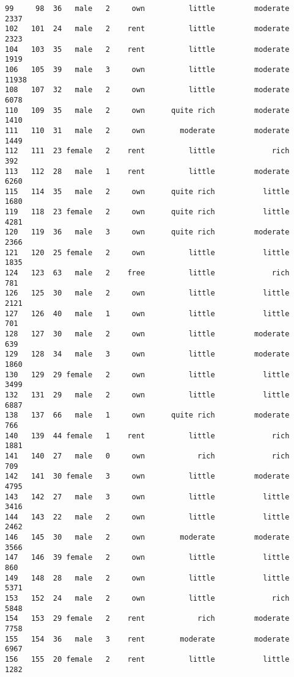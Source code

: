 \documentclass[
]{article}
\begin{document}
\begin{verbatim}
99     98  36   male   2     own          little         moderate          2337
102   101  24   male   2    rent          little         moderate          2323
104   103  35   male   2    rent          little         moderate          1919
106   105  39   male   3     own          little         moderate         11938
108   107  32   male   2     own          little         moderate          6078
110   109  35   male   2     own      quite rich         moderate          1410
111   110  31   male   2     own        moderate         moderate          1449
112   111  23 female   2    rent          little             rich           392
113   112  28   male   1    rent          little         moderate          6260
115   114  35   male   2     own      quite rich           little          1680
119   118  23 female   2     own      quite rich           little          4281
120   119  36   male   3     own      quite rich         moderate          2366
121   120  25 female   2     own          little           little          1835
124   123  63   male   2    free          little             rich           781
126   125  30   male   2     own          little           little          2121
127   126  40   male   1     own          little           little           701
128   127  30   male   2     own          little         moderate           639
129   128  34   male   3     own          little         moderate          1860
130   129  29 female   2     own          little           little          3499
132   131  29   male   2     own          little           little          6887
138   137  66   male   1     own      quite rich         moderate           766
140   139  44 female   1    rent          little             rich          1881
141   140  27   male   0     own            rich             rich           709
142   141  30 female   3     own          little         moderate          4795
143   142  27   male   3     own          little           little          3416
144   143  22   male   2     own          little           little          2462
146   145  30   male   2     own        moderate         moderate          3566
147   146  39 female   2     own          little           little           860
149   148  28   male   2     own          little           little          5371
153   152  24   male   2     own          little             rich          5848
154   153  29 female   2    rent            rich         moderate          7758
155   154  36   male   3    rent        moderate         moderate          6967
156   155  20 female   2    rent          little           little          1282

\end{verbatim}
\end{document}
